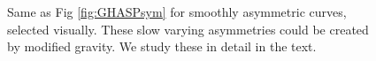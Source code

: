\documentclass[useAMS,usenatbib,twocolumn]{mn2e}
\begin{document}
\begin{figure}
\caption{Same as Fig \ref{fig:GHASPsym} for smoothly asymmetric curves, 
selected visually. These slow varying asymmetries could be created by modified
gravity. We study these in detail in the text.
\label{fig:GHASPasym}}
\end{figure}
\end{document}
